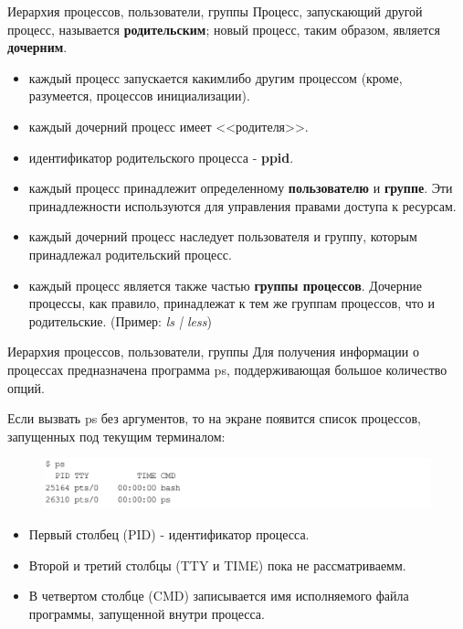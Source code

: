 \documentclass{beamer}
\begin{document}
\begin{frame}{Иерархия процессов, пользователи, группы}
Процесс, запускающий другой процесс, называется \textbf{родительским}; новый процесс, таким образом, является \textbf{дочерним}.
\begin{itemize}
\item каждый процесс запускается каким­либо другим процессом (кроме, разумеется, процессов инициализации). 
\item каждый дочерний процесс имеет <<родителя>>. 
\item идентификатор родительского процесса - \textbf{ppid}.
\item каждый процесс принадлежит определенному \textbf{пользователю} и \textbf{группе}. Эти принадлежности используются для управления правами доступа к ресурсам. 
\item каждый дочерний процесс наследует пользователя и группу, которым принадлежал родительский процесс.
\item каждый процесс является также частью \textbf{группы процессов}. Дочерние процессы, как правило, принадлежат к тем же группам процессов, что и родительские.
(Пример: \textit{ls | less}) 
\end{itemize}
\end{frame}

\begin{frame}{Иерархия процессов, пользователи, группы}
Для получения информации о процессах предназначена программа ps, поддерживающая большое количество опций.

Если вызвать ps без аргументов, то на экране появится список процессов, запущенных под текущим терминалом:
\begin{figure}[h]
\centering
\includegraphics[scale=0.5]{images/lec07-pic22.png}
\end{figure}
\begin{itemize}
\item Первый столбец (PID) - идентификатор процесса. 
\item Второй и третий столбцы (TTY и TIME) пока не рассматриваемм. 
\item В четвертом столбце (CMD) записывается имя исполняемого файла программы, запущенной внутри процесса.
\end{itemize}
\end{frame}
\end{document}
